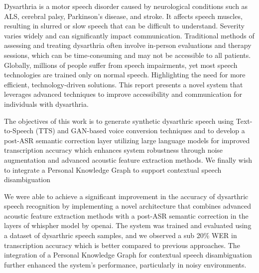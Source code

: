 \vspace{-1cm}

Dysarthria is a motor speech disorder caused by neurological conditions such as ALS, cerebral palsy, Parkinson’s disease, and stroke. It affects speech muscles, resulting in slurred or slow speech that can be difficult to understand. Severity varies widely and can significantly impact communication. Traditional methods of assessing and treating dysarthria often involve in-person evaluations and therapy sessions, which can be time-consuming and may not be accessible to all patients. Globally, millions of people suffer from speech impairments, yet most speech technologies are trained only on normal speech. Highlighting the need for more efficient, technology-driven solutions. This report presents a novel system that leverages advanced techniques to improve accessibility and communication for individuals with dysarthria.

The objectives of this work is to generate synthetic dysarthric speech using Text-to-Speech (TTS) and GAN-based voice conversion techniques and to develop a post-ASR semantic correction layer utilizing large language models for improved transcription accuracy which enhances system robustness through noise augmentation and advanced acoustic feature extraction methods. We finally wish to integrate a Personal Knowledge Graph to support contextual speech disambiguation

We were able to achieve a significant improvement in the accuracy of dysarthric speech recognition by implementing a novel architecture that combines advanced acoustic feature extraction methods with a post-ASR semantic correction in the layers of whispher model by openai. The system was trained and evaluated using a dataset of dysarthric speech samples, and we observed a sub 20\% WER in transcription accuracy which is better compared to previous approaches. The integration of a Personal Knowledge Graph for contextual speech disambiguation further enhanced the system's performance, particularly in noisy environments.  
\pagebreak